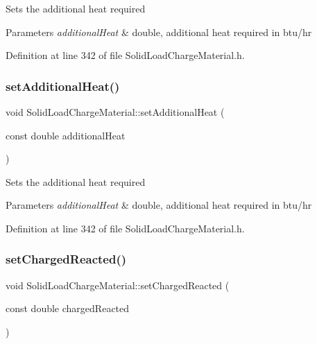 Sets the additional heat required 
\begin{DoxyParams}{Parameters}
{\em additional\+Heat} & double, additional heat required in btu/hr \\
\hline
\end{DoxyParams}


Definition at line 342 of file Solid\+Load\+Charge\+Material.\+h.

\mbox{\label{class_solid_load_charge_material_a849fd29a3ecb95be2e9d34f9280b1b94}} 
\subsubsection{\texorpdfstring{set\+Additional\+Heat()}{setAdditionalHeat()}\hspace{0.1cm}{\footnotesize\ttfamily [3/3]}}
{\footnotesize\ttfamily void Solid\+Load\+Charge\+Material\+::set\+Additional\+Heat (\begin{DoxyParamCaption}\item[{const double}]{additional\+Heat }\end{DoxyParamCaption})\hspace{0.3cm}{\ttfamily [inline]}}

Sets the additional heat required 
\begin{DoxyParams}{Parameters}
{\em additional\+Heat} & double, additional heat required in btu/hr \\
\hline
\end{DoxyParams}


Definition at line 342 of file Solid\+Load\+Charge\+Material.\+h.

\mbox{\label{class_solid_load_charge_material_a38f3b832ff29f779a78a51fd7352fcd4}} 
\subsubsection{\texorpdfstring{set\+Charged\+Reacted()}{setChargedReacted()}\hspace{0.1cm}{\footnotesize\ttfamily [1/3]}}
{\footnotesize\ttfamily void Solid\+Load\+Charge\+Material\+::set\+Charged\+Reacted (\begin{DoxyParamCaption}\item[{const double}]{charged\+Reacted }\end{DoxyParamCaption})\hspace{0.3cm}{\ttfamily [inline]}}

